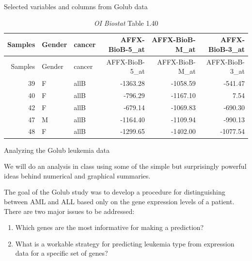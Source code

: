 \documentclass[10pt]{beamer}\usepackage[]{graphicx}\usepackage[]{color}
\begin{document}
						\begin{frame}{Selected variables and columns from Golub data}
							\protect\hypertarget{selected-variables-and-columns-from-golub-data}{}
							
							\captionsetup[table]{labelformat=empty}
							\scriptsize
							
							\scriptsize
							
							\begin{longtable}[]{@{}rllrrr@{}}
								\caption{\emph{OI Biostat} Table 1.40}\tabularnewline
								\toprule
								Samples & Gender & cancer & AFFX-BioB-5\_at & AFFX-BioB-M\_at &
								AFFX-BioB-3\_at\tabularnewline
								\midrule
								\endfirsthead
								\toprule
								Samples & Gender & cancer & AFFX-BioB-5\_at & AFFX-BioB-M\_at &
								AFFX-BioB-3\_at\tabularnewline
								\midrule
								\endhead
								39 & F & allB & -1363.28 & -1058.59 & -541.47\tabularnewline
								40 & F & allB & -796.29 & -1167.10 & 7.54\tabularnewline
								42 & F & allB & -679.14 & -1069.83 & -690.30\tabularnewline
								47 & M & allB & -1164.40 & -1109.94 & -990.13\tabularnewline
								48 & F & allB & -1299.65 & -1402.00 & -1077.54\tabularnewline
								\bottomrule
							\end{longtable}
							
							\normalsize
							
						\end{frame}
						
						\begin{frame}{Analyzing the Golub leukemia data}
							\protect\hypertarget{analyzing-the-golub-leukemia-data}{}
							
							We will do an analysis in class using some of the simple but
							surprisingly powerful ideas behind numerical and graphical summaries.
							
							The goal of the Golub study was to develop a procedure for
							distinguishing between AML and ALL based only on the gene expression
							levels of a patient. There are two major issues to be addressed:
							
							\begin{enumerate}
								\item
								Which genes are the most informative for making a prediction?
								\item
								What is a workable strategy for predicting leukemia type from
								expression data for a specific set of genes?
							\end{enumerate}
							
						\end{frame}
						
\end{document}
